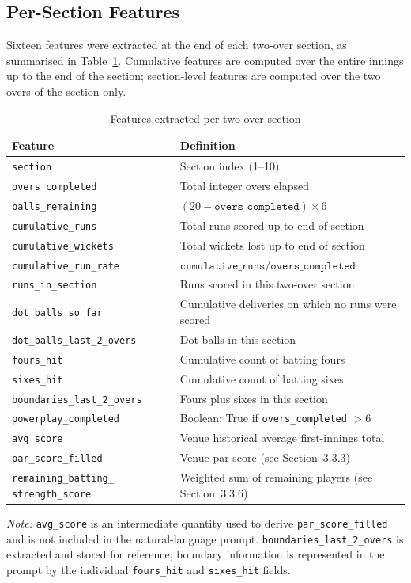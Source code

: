 \subsection{Per-Section Features}

Sixteen features were extracted at the end of each two-over section, as summarised in Table~\ref{tab:features}. Cumulative features are computed over the entire innings up to the end of the section; section-level features are computed over the two overs of the section only.

\begin{table}[ht]
\centering
\caption{Features extracted per two-over section}
\label{tab:features}
\begin{tabular}{p{5.5cm} p{8.5cm}}
\hline
\textbf{Feature} & \textbf{Definition} \\
\hline
\texttt{section} & Section index (1–10) \\
\texttt{overs\_completed} & Total integer overs elapsed \\
\texttt{balls\_remaining} & $(20 - \texttt{overs\_completed}) \times 6$ \\
\texttt{cumulative\_runs} & Total runs scored up to end of section \\
\texttt{cumulative\_wickets} & Total wickets lost up to end of section \\
\texttt{cumulative\_run\_rate} & $\texttt{cumulative\_runs} / \texttt{overs\_completed}$ \\
\texttt{runs\_in\_section} & Runs scored in this two-over section \\
\texttt{dot\_balls\_so\_far} & Cumulative deliveries on which no runs were scored \\
\texttt{dot\_balls\_last\_2\_overs} & Dot balls in this section \\
\texttt{fours\_hit} & Cumulative count of batting fours \\
\texttt{sixes\_hit} & Cumulative count of batting sixes \\
\texttt{boundaries\_last\_2\_overs} & Fours plus sixes in this section \\
\texttt{powerplay\_completed} & Boolean: True if \texttt{overs\_completed} $> 6$ \\
\texttt{avg\_score} & Venue historical average first-innings total \\
\texttt{par\_score\_filled} & Venue par score (see Section~3.3.3) \\
\texttt{remaining\_batting\_} \texttt{strength\_score} & Weighted sum of remaining players (see Section~3.3.6) \\
\hline
\end{tabular}
\vspace{4pt}
{\footnotesize \textit{Note:} \texttt{avg\_score} is an intermediate quantity used to derive \texttt{par\_score\_filled} and is not included in the natural-language prompt. \texttt{boundaries\_last\_2\_overs} is extracted and stored for reference; boundary information is represented in the prompt by the individual \texttt{fours\_hit} and \texttt{sixes\_hit} fields.}
\end{table}


